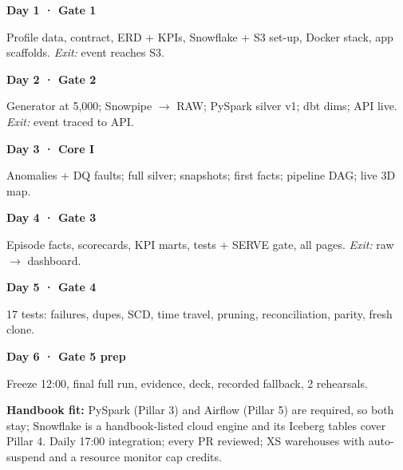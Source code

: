 \documentclass[10pt,a4paper]{article}
\begin{document}
\begin{tcbraster}[raster columns=6, raster equal height, raster column skip=4pt, enhanced, colback=rowalt, colframe=rowalt, borderline north={1.6pt}{0pt}{blue}, arc=0pt, boxrule=0pt, left=3pt, right=3pt, top=3pt, bottom=3pt, fontupper=\scriptsize\raggedright]
\begin{tcolorbox}{\footnotesize\bfseries\color{navy} Day 1 · Gate 1\par}\vspace{1pt}Profile data, contract, ERD + KPIs, Snowflake + S3 set-up, Docker stack, app scaffolds. \textit{Exit:} event reaches S3.\end{tcolorbox}
\begin{tcolorbox}{\footnotesize\bfseries\color{navy} Day 2 · Gate 2\par}\vspace{1pt}Generator at 5,000; Snowpipe $\rightarrow$ RAW; PySpark silver v1; dbt dims; API live. \textit{Exit:} event traced to API.\end{tcolorbox}
\begin{tcolorbox}{\footnotesize\bfseries\color{navy} Day 3 · Core I\par}\vspace{1pt}Anomalies + DQ faults; full silver; snapshots; first facts; pipeline DAG; live 3D map.\end{tcolorbox}
\begin{tcolorbox}{\footnotesize\bfseries\color{navy} Day 4 · Gate 3\par}\vspace{1pt}Episode facts, scorecards, KPI marts, tests + SERVE gate, all pages. \textit{Exit:} raw $\rightarrow$ dashboard.\end{tcolorbox}
\begin{tcolorbox}{\footnotesize\bfseries\color{navy} Day 5 · Gate 4\par}\vspace{1pt}17 tests: failures, dupes, SCD, time travel, pruning, reconciliation, parity, fresh clone.\end{tcolorbox}
\begin{tcolorbox}{\footnotesize\bfseries\color{navy} Day 6 · Gate 5 prep\par}\vspace{1pt}Freeze 12:00, final full run, evidence, deck, recorded fallback, 2 rehearsals.\end{tcolorbox}
\end{tcbraster}
\vspace{4pt}
{\footnotesize\color{muted}\textbf{\color{ink}Handbook fit:} PySpark (Pillar 3) and Airflow (Pillar 5) are required, so both stay; Snowflake is a handbook-listed cloud engine and its Iceberg tables cover Pillar 4. Daily 17:00 integration; every PR reviewed; XS warehouses with auto-suspend and a resource monitor cap credits.}
\end{document}
